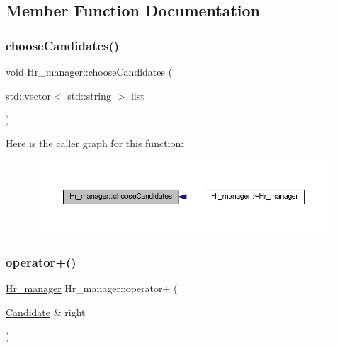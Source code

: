 \subsection{Member Function Documentation}
\hypertarget{class_hr__manager_ad172002747343f207758c2ea76d6e480}{}\label{class_hr__manager_ad172002747343f207758c2ea76d6e480} 
\subsubsection{\texorpdfstring{choose\+Candidates()}{chooseCandidates()}}
{\footnotesize\ttfamily void Hr\+\_\+manager\+::choose\+Candidates (\begin{DoxyParamCaption}\item[{std\+::vector$<$ std\+::string $>$}]{list }\end{DoxyParamCaption})}

Here is the caller graph for this function\+:
\nopagebreak
\begin{figure}[H]
\begin{center}
\leavevmode
\includegraphics[width=350pt]{class_hr__manager_ad172002747343f207758c2ea76d6e480_icgraph}
\end{center}
\end{figure}
\hypertarget{class_hr__manager_a3315b88815233ab95cd924280086d8a9}{}\label{class_hr__manager_a3315b88815233ab95cd924280086d8a9} 
\subsubsection{\texorpdfstring{operator+()}{operator+()}}
{\footnotesize\ttfamily \hyperlink{class_hr__manager}{Hr\+\_\+manager} Hr\+\_\+manager\+::operator+ (\begin{DoxyParamCaption}\item[{\hyperlink{class_candidate}{Candidate} \&}]{right }\end{DoxyParamCaption})}

